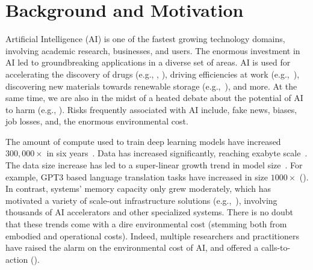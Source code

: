 \section{Background and Motivation}
{
    \label{background}

    Artificial Intelligence (AI) is one of the fastest growing technology domains, involving academic research, businesses, and users. The enormous investment in AI led to groundbreaking applications in a diverse set of areas. AI is used for accelerating the discovery of drugs (e.g., \cite{Stark2022}, \cite{Ross2022}), driving efficiencies at work (e.g.,~\cite{Puri2021}), discovering new materials towards renewable storage (e.g.,~\cite{Zitnick2020}), and more. At the same time, we are also in the midst of a heated debate about the potential of AI to harm (e.g., \cite{AIdanger}). Risks frequently associated with AI include, fake news, biases, job losses, and, the enormous environmental cost. 

    The amount of compute used to train deep learning models have increased $300,\!000 \times$ in six years~\cite{Schwartz2019}. Data has increased significantly, reaching exabyte scale~\cite{Wu2022}. The data size increase has led to a super-linear growth trend in model size~\cite{Wu2022}. For example, GPT3 based language translation tasks have increased in size $1000 \times$ (\cite{Brown2020}). In contrast, systems' memory capacity only grew moderately, which has motivated a variety of scale-out infrastructure solutions (e.g.,~\cite{Patterson2021,Wu2022}), involving thousands of AI accelerators and other specialized systems. There is no doubt that these trends come with a dire environmental cost (stemming both from embodied and operational costs). Indeed, multiple researchers and practitioners have raised the alarm on the environmental cost of AI, and offered a calls-to-action (\cite{Strubell2019,Lacoste2019,Henderson2020,Schwartz2019}). 

}

